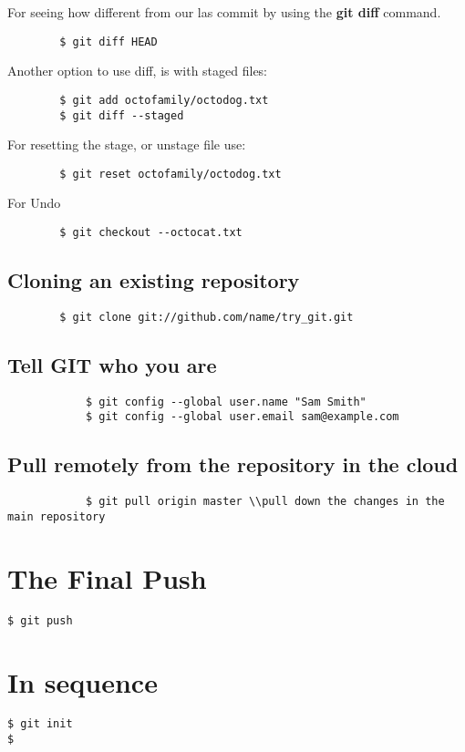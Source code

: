 \documentclass[12pt]{article}
\begin{document}
		For seeing how different from our las commit by using the \textbf{git diff} command. 

		\begin{verbatim}
		$ git diff HEAD
		\end{verbatim}

		Another option to use diff, is with staged files:

		\begin{verbatim}
		$ git add octofamily/octodog.txt
		$ git diff --staged		
		\end{verbatim}


		For resetting the stage, or unstage file use: 

		\begin{verbatim}
		$ git reset octofamily/octodog.txt		
		\end{verbatim}

		For Undo

		\begin{verbatim}
		$ git checkout --octocat.txt
		\end{verbatim}


	\subsection{Cloning an existing repository}

		\begin{verbatim}
		$ git clone git://github.com/name/try_git.git
		\end{verbatim}

	\subsection{Tell GIT who you are}

			\begin{verbatim}
			$ git config --global user.name "Sam Smith"
			$ git config --global user.email sam@example.com
			\end{verbatim}



	\subsection{Pull remotely from the repository in the cloud}

			\begin{verbatim}
			$ git pull origin master \\pull down the changes in the main repository
			\end{verbatim}

\section{The Final Push}


\begin{verbatim}
$ git push 
\end{verbatim}
 
\section{In sequence}
 

\begin{verbatim}
$ git init
$ 
\end{verbatim}
 
\end{document}
